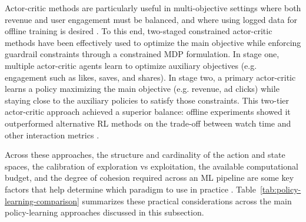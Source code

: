 \documentclass[manuscript,review,screen]{acmart}
\begin{document}
Actor-critic methods are particularly useful in multi-objective settings where both revenue and user engagement must be balanced, and where using logged data for offline training is desired \cite{cai2023two}. To this end, two-staged constrained actor-critic methods have been effectively used to optimize the main objective while enforcing guardrail constraints through a constrained MDP formulation. In stage one, multiple actor-critic agents learn to optimize auxiliary objectives (e.g. engagement such as likes, saves, and shares). In stage two, a primary actor-critic learns a policy maximizing the main objective (e.g. revenue, ad clicks) while staying close to the auxiliary policies to satisfy those constraints. This two-tier actor-critic approach achieved a superior balance: offline experiments showed it outperformed alternative RL methods on the trade-off between watch time and other interaction metrics \cite{cai2023two}.

Across these approaches, the structure and cardinality of the action and state spaces, the calibration of exploration vs exploitation, the available computational budget, and the degree of cohesion required across an ML pipeline are some key factors that help determine which paradigm to use in practice \cite{dulac2021challenges, zhu2021overview}. Table~\ref{tab:policy-learning-comparison} summarizes these practical considerations across the main policy-learning approaches discussed in this subsection.
\end{document}
